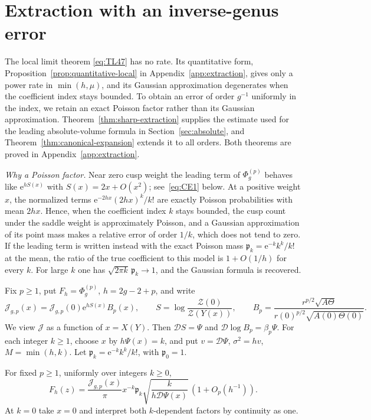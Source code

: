 \section{Extraction with an inverse-genus error}
\label{sec:sharp-extraction}

The local limit theorem \eqref{eq:TL47} has no rate. Its quantitative form, Proposition~\ref{prop:quantitative-local} in Appendix~\ref{app:extraction}, gives only a power rate in $\min(h,\mu)$, and its Gaussian approximation degenerates when the coefficient index stays bounded. To obtain an error of order $g^{-1}$ uniformly in the index, we retain an exact Poisson factor rather than its Gaussian approximation. Theorem~\ref{thm:sharp-extraction} supplies the estimate used for the leading absolute-volume formula in Section~\ref{sec:absolute}, and Theorem~\ref{thm:canonical-expansion} extends it to all orders. Both theorems are proved in Appendix~\ref{app:extraction}.

\emph{Why a Poisson factor.} Near zero cusp weight the leading term of $\Phi_g^{(p)}$ behaves like $\mathrm e^{hS(x)}$ with $S(x)=2x+O(x^2)$; see~\eqref{eq:CE1} below. At a positive weight $x$, the normalized terms $\mathrm e^{-2hx}(2hx)^k/k!$ are exactly Poisson probabilities with mean $2hx$. Hence, when the coefficient index $k$ stays bounded, the cusp count under the saddle weight is approximately Poisson, and a Gaussian approximation of its point mass makes a relative error of order $1/k$, which does not tend to zero. If the leading term is written instead with the exact Poisson mass $\mathfrak p_k=\mathrm e^{-k}k^k/k!$ at the mean, the ratio of the true coefficient to this model is $1+O(1/h)$ for every $k$. For large $k$ one has $\sqrt{2\pi k}\,\mathfrak p_k\to1$, and the Gaussian formula is recovered.

Fix $p\ge1$, put $F_h=\Phi_g^{(p)}$, $h=2g-2+p$, and write
\begin{equation}
 \mathcal J_{g,p}(x)=\mathcal J_{g,p}(0)\mathrm{e}^{hS(x)}B_p(x),\qquad
 S=\log\frac{\mathcal Z(0)}{\mathcal Z(Y(x))},\qquad
 B_p=\frac{r^{p/2}\sqrt{A\Theta}}{r(0)^{p/2}\sqrt{A(0)\Theta(0)}}.
 \label{eq:CE1}
\end{equation}
We view $\mathcal J$ as a function of $x=X(Y)$. Then
$\mathscr DS=\Psi$ and $\mathscr D\log B_p=\beta_p\Psi$.
For each integer $k\ge1$, choose $x$ by $h\Psi(x)=k$, and put
$v=\mathscr D\Psi$, $\sigma^2=hv$, $M=\min(h,k)$.
Let $\mathfrak p_k=\mathrm{e}^{-k}k^k/k!$, with $\mathfrak p_0=1$.

\begin{theorem}\label{thm:sharp-extraction}
For fixed $p\ge1$, uniformly over integers $k\ge0$,
\begin{equation}
 [z^k]F_h(z)=\frac{\mathcal J_{g,p}(x)}\pi x^{-k}\mathfrak p_k
       \sqrt{\frac{k}{h\mathscr D\Psi(x)}}\,(1+O_p(h^{-1})).
 \label{eq:CE2}
\end{equation}
At $k=0$ take $x=0$ and interpret both $k$-dependent factors by
continuity as one.
\end{theorem}

